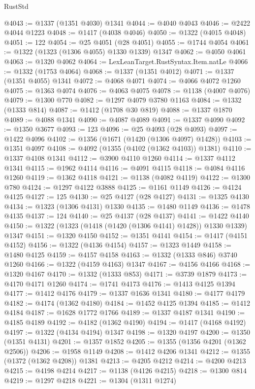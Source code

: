 \begin{lexlean}{RustStd}
\begin{coremodule}
@4043 := @1337 (@1351 @4030) @1341
@4044 := @4040 @4043
@4046 := @2422 @4044 @1223
@4048 := @1417 (@4038 @4046)
@4050 := @1322 (@4015 @4048)
@4051 := 122
@4054 := @25 @4051 (@28 @4051)
@4055 := @1744 @4054
@4061 := @1322 (@1323 (@1306 @4055) @1330 @1339) @1347
@4062 := @4050 @4061
@4063 := @1320 @4062
@4064 := LexLeanTarget.RustSyntax.Item.natLe
@4066 := @1332 (@1753 @4064)
@4068 := @1337 (@1351 @4012)
@4071 := @1337 (@1351 @4055) @1341
@4072 := @4068 @4071
@4074 := @4066 @4072 @1260
@4075 := @1363 @4074
@4076 := @4063 @4075
@4078 := @1138 (@4007 @4076)
@4079 := @1300 @770
@4082 := @1297 @4079 @3780 @1163
@4084 := @1332 (@1333 @814)
@4087 := @1412 (@1708 @30 @819)
@4088 := @1337 @1870
@4089 := @4088 @1341
@4090 := @4087 @4089
@4091 := @1337 @4090
@4092 := @1350 @3677
@4093 := 123
@4096 := @25 @4093 (@28 @4093)
@4097 := @1422 @4096
@4102 := @1356 (@1671 (@1420 (@1306 @4097) @1428))
@4103 := @1351 @4097
@4108 := @4092 (@1355 (@4102 (@1362 @4103)) @1381)
@4110 := @1337 @4108 @1341
@4112 := @3900 @4110 @1260
@4114 := @1337 @4112 @1341
@4115 := @1962 @4114
@4116 := @4091 @4115
@4118 := @4084 @4116 @1260
@4119 := @1362 @4118
@4121 := @1138 (@4082 @4119)
@4122 := @1300 @780
@4124 := @1297 @4122 @3888
@4125 := @1161 @1149
@4126 := @4124 @4125
@4127 := 125
@4130 := @25 @4127 (@28 @4127)
@4131 := @1325 @4130
@4134 := @1323 (@1306 @4131) @1330
@4135 := @1480 @1149
@4136 := @1478 @4135
@4137 := 124
@4140 := @25 @4137 (@28 @4137)
@4141 := @1422 @4140
@4150 := @1322 (@1323 (@1418 (@1420 (@1306 @4141) @1428)) @1330 @1339) @1347
@4151 := @1320 @4150
@4152 := @1351 @4141
@4154 := @1417 (@4151 @4152)
@4156 := @1322 (@4136 @4154)
@4157 := @1323 @1449
@4158 := @1480 @4125
@4159 := @4157 @4158
@4163 := @1332 (@1333 @846) @3740 @1260
@4166 := @1322 (@4159 @4163) @1347
@4167 := @4156 @4166
@4168 := @1320 @4167
@4170 := @1332 (@1333 @853)
@4171 := @3739 @1879
@4173 := @4170 @4171 @1260
@4174 := @1741 @4173
@4176 := @1413 @4125 @1394
@4177 := @1412 @4176
@4179 := @1337 @1636 @1341
@4180 := @4177 @4179
@4182 := @4174 (@1362 @4180)
@4184 := @1452 @4125 @1394
@4185 := @1412 @4184
@4187 := @1628 @1772 @1766
@4189 := @1337 @4187 @1341
@4190 := @4185 @4189
@4192 := @4182 (@1362 @4190)
@4194 := @1417 (@4168 @4192)
@4197 := @1322 (@4134 @4194) @1347
@4198 := @1320 @4197
@4200 := @1350 (@1351 @4131)
@4201 := @1357 @1852
@4205 := @1355 (@1356 @4201 (@1362 @2506))
@4206 := @1958 @1149
@4208 := @1412 @4206 @1341
@4212 := @1355 (@1372 (@1362 @4208)) @1381
@4213 := @4205 @4212
@4214 := @4200 @4213
@4215 := @4198 @4214
@4217 := @1138 (@4126 @4215)
@4218 := @1300 @814
@4219 := @1297 @4218
@4221 := @1304 (@1311 @1274)

\end{coremodule}
\end{lexlean}
